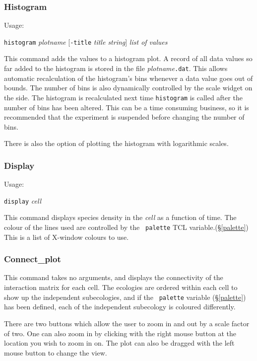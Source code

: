 \subsubsection{Histogram}

Usage:

{\tt histogram}  {\em plotname} [{\tt -title} {\em title string}] {\em
  list of values}

This command adds the values to a histogram plot. A record of all data
values so far added to the histogram is stored in the file {\em
  plotname}{\tt .dat}. This allows automatic recalculation of the
histogram's bins whenever a data value goes out of bounds. The number
of bins is also dynamically controlled by the scale widget on the
side. The histogram is recalculated next time {\tt histogram} is
called after the number of bins has been altered. This can be a time
consuming business, so it is recommended that the experiment is
suspended before changing the number of bins.

There is also the option of plotting the histogram with logarithmic scales.

\subsubsection{Display}\label{display}

Usage:

{\tt display} {\em cell} 

This command displays species density in the {\em cell} as a function
of time. The colour of the lines used are controlled by the {\tt
  palette} TCL variable.(\S\ref{palette}) This is a list of X-window
colours to use.

\subsubsection{Connect\_plot}\label{connect}

This command takes no arguments, and displays the connectivity of the
interaction matrix for each cell. The ecologies are ordered within
each cell to show up the independent subecologies, and if the {\tt
  palette} variable (\S\ref{palette}) has been defined, each of the independent
subecology is coloured differently.

There are two buttons which allow the user to zoom in and out by a
scale factor of two.  One can also zoom in by clicking with the right
mouse button at the location you wish to zoom in on.  The plot can
also be dragged with the left mouse button to change the view.

